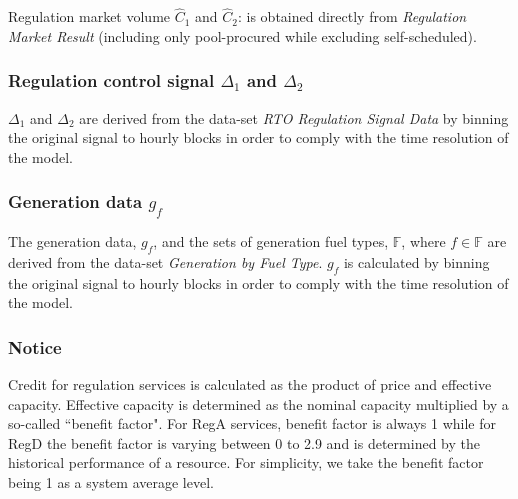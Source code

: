 Regulation market volume $\hat{C}_1$ and $\hat{C}_2$: is obtained directly from \textit{Regulation Market Result} (including only pool-procured while excluding self-scheduled).

\subsubsection{Regulation control signal $\Delta_1$ and $\Delta_2$}
$\Delta_1$ and $\Delta_2$ are derived from the data-set \textit{RTO Regulation Signal Data} by binning the original signal to hourly blocks in order to comply with the time resolution of the model.

\subsubsection{Generation data $g_{f}$}

The generation data, $g_{f}$, and the sets of generation fuel types, $\mathbb{F}$, where $f \in \mathbb{F}$ are derived from the data-set \textit{Generation by Fuel Type}.  $g_{f}$ is calculated by binning the original signal to hourly blocks in order to comply with the time resolution of the model.

\subsubsection{Notice}
Credit for regulation services is calculated as the product of price and effective capacity. Effective capacity is determined as the nominal capacity multiplied by a so-called ``benefit factor". For RegA services, benefit factor is always 1 while for RegD the benefit factor is varying between 0 to 2.9 and is determined by the historical performance of a resource. For simplicity, we take the benefit factor being 1 as a system average level.





